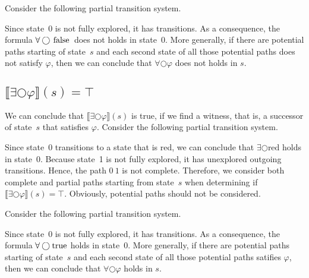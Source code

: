 \documentclass[12pt]{article}
\newcommand{\nxt}{\bigcirc}
\newcommand{\TRUE}{\mbox{\lstinline{true}}}
\newcommand{\FALSE}{\mbox{\lstinline{false}}}
\theoremstyle{definition}
\newcommand{\satisfaction}[1]{\llbracket #1 \rrbracket}
\begin{document}
Consider the following partial transition system.
\begin{center}
\end{center}
Since state~0 is not fully explored, it has transitions.  As a consequence, the formula $\forall \nxt \FALSE$ does not holds in state~0.  More generally, if there are potential paths starting of state~$s$ and each second state of all those potential paths does not satisfy $\varphi$, then we can conclude that $\forall \nxt \varphi$ does not holds in $s$.

\subsection*{$\satisfaction{\exists \nxt \varphi}(s) = \top$}

We can conclude that $\satisfaction{\exists \nxt \varphi}(s)$ is true, if we find a witness, that is, a successor of state~$s$ that satisfies $\varphi$.  Consider the following partial transition system.
\begin{center}
\end{center}
Since state~0 transitions to a state that is red, we can conclude that $\exists \nxt \mbox{red}$ holds in state~0.  Because state~1 is not fully explored, it has unexplored outgoing transitions.  Hence, the path $0\ 1$ is not complete.  Therefore, we consider both complete and partial paths starting from state~$s$ when determining if $\satisfaction{\exists \nxt \varphi}(s) = \top$.  Obviously, potential paths should not be considered.

Consider the following partial transition system.
\begin{center}
\end{center}
Since state~0 is not fully explored, it has transitions.  As a consequence, the formula $\forall \nxt \TRUE$ holds in state~0.  More generally, if there are potential paths starting of state~$s$ and each second state of all those potential paths satifies $\varphi$, then we can conclude that $\forall \nxt \varphi$ holds in $s$.
\end{document}
